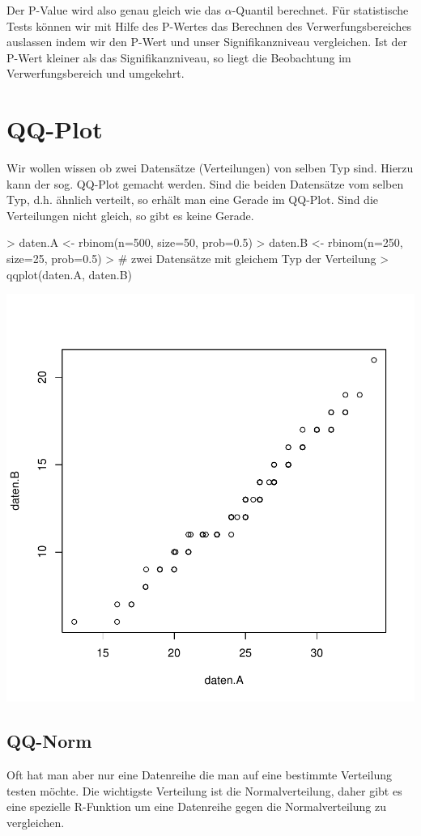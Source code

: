 \noindent
Der P-Value wird also genau gleich wie das $\alpha$-Quantil berechnet.
Für statistische Tests können wir mit Hilfe des P-Wertes das Berechnen
des Verwerfungsbereiches auslassen indem wir den P-Wert und unser
Signifikanzniveau vergleichen. Ist der P-Wert kleiner als das 
Signifikanzniveau, so liegt die Beobachtung im Verwerfungsbereich
und umgekehrt.

\section{QQ-Plot}
Wir wollen wissen ob zwei Datensätze (Verteilungen) von selben Typ sind.
Hierzu kann der sog. QQ-Plot gemacht werden. Sind die beiden Datensätze
vom selben Typ, d.h. ähnlich verteilt, so erhält man eine Gerade im 
QQ-Plot. Sind die Verteilungen nicht gleich, so gibt es keine Gerade. 

\begin{Schunk}
\begin{Sinput}
> daten.A <- rbinom(n=500, size=50, prob=0.5)
> daten.B <- rbinom(n=250, size=25, prob=0.5)
> # zwei Datensätze mit gleichem Typ der Verteilung
> qqplot(daten.A, daten.B)
\end{Sinput}
\end{Schunk}
\includegraphics{definitionen-029}

\subsection{QQ-Norm}
Oft hat man aber nur eine Datenreihe die man auf eine bestimmte 
Verteilung testen möchte. Die wichtigste Verteilung ist die
Normalverteilung, daher gibt es eine spezielle R-Funktion um
eine Datenreihe gegen die Normalverteilung zu vergleichen.

